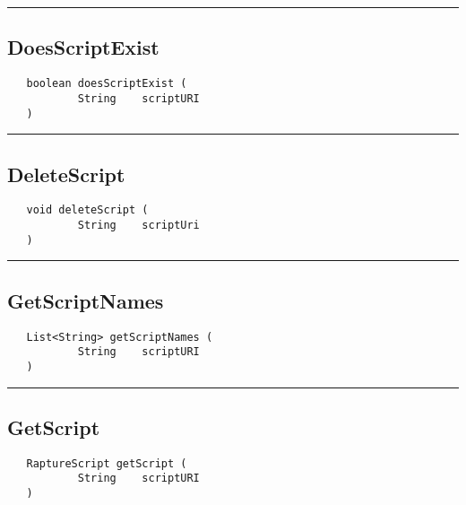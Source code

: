 \rule{15cm}{2pt}
\subsection{DoesScriptExist}
\label{Api:DoesScriptExist}
\begin{verbatim}
   boolean doesScriptExist (
           String    scriptURI
   )
\end{verbatim}



\rule{15cm}{2pt}
\subsection{DeleteScript}
\label{Api:DeleteScript}
\begin{verbatim}
   void deleteScript (
           String    scriptUri
   )
\end{verbatim}



\rule{15cm}{2pt}
\subsection{GetScriptNames}
\label{Api:GetScriptNames}
\begin{verbatim}
   List<String> getScriptNames (
           String    scriptURI
   )
\end{verbatim}



\rule{15cm}{2pt}
\subsection{GetScript}
\label{Api:GetScript}
\begin{verbatim}
   RaptureScript getScript (
           String    scriptURI
   )
\end{verbatim}




